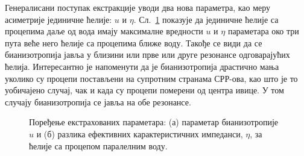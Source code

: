 \documentclass[main.tex]{subfiles}
\begin{document}
Генералисани поступак екстракције уводи два нова параметра, као меру асиметрије јединичне ћелије: $u$ и $\eta$. Сл.~\ref{fig12} показује да јединичне ћелије са процепима даље од вода имају максималне вредности $u$ и $\eta$ параметара око три пута веће него ћелије са процепима ближе воду. Такође се види да се бианизотропија јавља у близини или прве или друге резонансе одговарајућих ћелија. Интересантно је напоменути да је бианизотропија драстично мања уколико су процепи постављени на супротним странама СРР-ова, као што је то уобичајено случај, чак и када су процепи померени од центра ивице. У том случају бианизотропија се јавља на обе резонансе.
\begin{figure}[!t]
\centering
{}\hfill
{}
\caption{Поређење екстрахованих параметара: (а) параметар бианизотропије $u$ и (б) разлика ефективних карактеристичних импеданси, $\eta$, за ћелије са процепом паралелним воду.}
\label{fig12}
\end{figure} 
\end{document}
